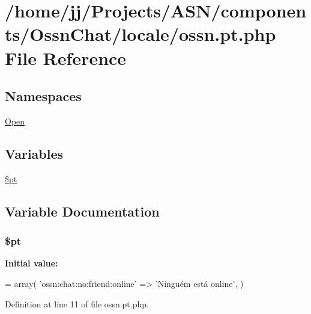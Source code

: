 \hypertarget{components_2_ossn_chat_2locale_2ossn_8pt_8php}{}\section{/home/jj/\+Projects/\+A\+S\+N/components/\+Ossn\+Chat/locale/ossn.pt.\+php File Reference}
\label{components_2_ossn_chat_2locale_2ossn_8pt_8php}
\subsection*{Namespaces}
\begin{DoxyCompactItemize}
\item 
 \hyperlink{namespace_open}{Open}
\end{DoxyCompactItemize}
\subsection*{Variables}
\begin{DoxyCompactItemize}
\item 
\hyperlink{components_2_ossn_chat_2locale_2ossn_8pt_8php_a62c150775a7a00e8663463c638016cad}{\$pt}
\end{DoxyCompactItemize}


\subsection{Variable Documentation}
\subsubsection[{\texorpdfstring{\$pt}{$pt}}]{\setlength{\rightskip}{0pt plus 5cm}\$pt}\hypertarget{components_2_ossn_chat_2locale_2ossn_8pt_8php_a62c150775a7a00e8663463c638016cad}{}\label{components_2_ossn_chat_2locale_2ossn_8pt_8php_a62c150775a7a00e8663463c638016cad}
{\bfseries Initial value\+:}
\begin{DoxyCode}
= array(
    \textcolor{stringliteral}{'ossn:chat:no:friend:online'} => \textcolor{stringliteral}{'Ninguém está online'},
)
\end{DoxyCode}


Definition at line 11 of file ossn.\+pt.\+php.

